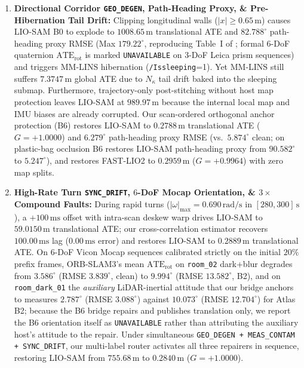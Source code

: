 \documentclass[journal]{IEEEtran}
\begin{document}
\begin{enumerate}
    \item \textbf{Directional Corridor \texttt{GEO\_DEGEN}, Path-Heading Proxy, \& Pre-Hibernation Tail Drift:} Clipping longitudinal walls ($|x|\ge 0.65\,\mathrm{m}$) causes LIO-SAM B0 to explode to $\mathbf{1008.65\,\mathrm{m}}$ translational ATE and $\mathbf{82.788^\circ}$ path-heading proxy RMSE (Max $179.22^\circ$, reproducing Table~I of \cite{ma2025mmlins}; formal $6$-DoF quaternion $\mathrm{ATE}_{\mathrm{rot}}$ is marked \texttt{UNAVAILABLE} on $3$-DoF Leica prism sequences) and triggers MM-LINS hibernation (\texttt{/Issleeping}=1). Yet MM-LINS still suffers $7.3747\,\mathrm{m}$ global ATE due to $N_\kappa$ tail drift baked into the sleeping submap. Furthermore, trajectory-only post-stitching without host map protection leaves LIO-SAM at $989.97\,\mathrm{m}$ because the internal local map and IMU biases are already corrupted. Our scan-ordered orthogonal anchor protection (B6) restores LIO-SAM to $\mathbf{0.2788\,\mathrm{m}}$ translational ATE ($G=+1.0000$) and $\mathbf{6.279^\circ}$ path-heading proxy RMSE (vs.\ $5.874^\circ$ clean; on plastic-bag occlusion B6 restores LIO-SAM path-heading proxy from $90.582^\circ$ to $\mathbf{5.247^\circ}$), and restores FAST-LIO2 to $\mathbf{0.2959\,\mathrm{m}}$ ($G=+0.9964$) with zero map splits.
    \item \textbf{High-Rate Turn \texttt{SYNC\_DRIFT}, $6$-DoF Mocap Orientation, \& $3\times$ Compound Faults:} During rapid turns ($|\omega|_{\max}=0.690\,\mathrm{rad/s}$ in $[280,300]\,\mathrm{s}$), a $+100\,\mathrm{ms}$ offset with intra-scan deskew warp drives LIO-SAM to $59.0150\,\mathrm{m}$ translational ATE; our cross-correlation estimator recovers $100.00\,\mathrm{ms}$ lag ($0.00\,\mathrm{ms}$ error) and restores LIO-SAM to $\mathbf{0.2889\,\mathrm{m}}$ translational ATE. On $6$-DoF Vicon Mocap sequences calibrated strictly on the initial $20\%$ prefix frames, ORB-SLAM3's mean $\mathrm{ATE}_{\mathrm{rot}}$ on \texttt{room\_02} dark+blur degrades from $3.586^\circ$ (RMSE $3.839^\circ$, clean) to $9.994^\circ$ (RMSE $13.582^\circ$, B2), and on \texttt{room\_dark\_01} the \emph{auxiliary} LiDAR-inertial attitude that our bridge anchors to measures $\mathbf{2.787^\circ}$ (RMSE $\mathbf{3.088^\circ}$) against $10.073^\circ$ (RMSE $12.704^\circ$) for Atlas B2; because the B6 bridge repairs and publishes translation only, we report the B6 orientation itself as \texttt{UNAVAILABLE} rather than attributing the auxiliary host's attitude to the repair. Under simultaneous \texttt{GEO\_DEGEN + MEAS\_CONTAM + SYNC\_DRIFT}, our multi-label router activates all three repairers in sequence, restoring LIO-SAM from $755.68\,\mathrm{m}$ to $\mathbf{0.2840\,\mathrm{m}}$ ($G=+1.0000$).

\end{enumerate}
\end{document}
